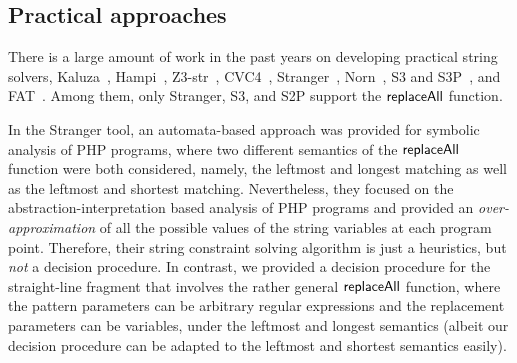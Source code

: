\subsection*{Practical approaches}

There is a large amount of work in the past years on developing practical string solvers, Kaluza~\cite{Berkeley-JavaScript}, Hampi~\cite{HAMPI}, Z3-str~\cite{z3-str}, CVC4~\cite{cvc4}, Stranger~\cite{YABI14}, Norn~\cite{Abdulla14}, S3 and S3P~\cite{S3,TCJ16}, and FAT~\cite{Abdulla17}.
Among them, only Stranger, S3, and S2P support the $\mathsf{replaceAll}$ function.  





In the Stranger tool, %
an automata-based approach was provided for symbolic analysis of PHP programs, where two different semantics of the $\mathsf{replaceAll}$ function were both considered, namely, the leftmost and longest matching as well as the leftmost and shortest matching. Nevertheless, they focused on the abstraction-interpretation based analysis of PHP programs and provided an \emph{over-approximation} of all the possible values of the string variables at each program point. Therefore, their string constraint solving algorithm is just a heuristics, but \emph{not} a decision procedure. In contrast, we provided a decision procedure for the straight-line fragment that involves the rather general $\mathsf{replaceAll}$ function, where the pattern parameters can be arbitrary regular expressions and the replacement parameters can be variables, under the leftmost and longest semantics (albeit our decision procedure can be adapted to the leftmost and shortest semantics easily).

